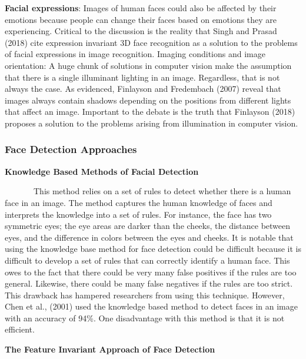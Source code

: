 \documentclass[
  12pt,
]{report}
\begin{document}
\textbf{Facial expressions}: Images of human faces could also be
affected by their emotions because people can change their faces based
on emotions they are experiencing. Critical to the discussion is the
reality that Singh and Prasad (2018) cite expression invariant 3D face
recognition as a solution to the problems of facial expressions in image
recognition. Imaging conditions and image orientation: A huge chunk of
solutions in computer vision make the assumption that there is a single
illuminant lighting in an image. Regardless, that is not always the
case. As evidenced, Finlayson and Fredembach (2007) reveal that images
always contain shadows depending on the positions from different lights
that affect an image. Important to the debate is the truth that
Finlayson (2018) proposes a solution to the problems arising from
illumination in computer vision.

\subsubsection{\texorpdfstring{Face Detection Approaches\\
}{Face Detection Approaches }}\label{face-detection-approaches}

\textbf{Knowledge Based Methods of Facial Detection}\\
\vspace{-1.2em}

~~~~~~~This method relies on a set of rules to detect whether there is a
human face in an image. The method captures the human knowledge of faces
and interprets the knowledge into a set of rules. For instance, the face
has two symmetric eyes; the eye areas are darker than the cheeks, the
distance between eyes, and the difference in colors between the eyes and
cheeks. It is notable that using the knowledge base method for face
detection could be difficult because it is difficult to develop a set of
rules that can correctly identify a human face. This owes to the fact
that there could be very many false positives if the rules are too
general. Likewise, there could be many false negatives if the rules are
too strict. This drawback has hampered researchers from using this
technique. However, Chen et al., (2001) used the knowledge based method
to detect faces in an image with an accuracy of 94\%. One disadvantage
with this method is that it is not efficient.

\textbf{The Feature Invariant Approach of Face Detection}\\
\vspace{-1.2em}
\end{document}
